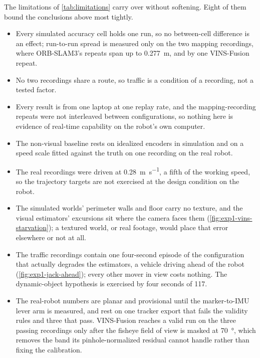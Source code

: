 The limitations of \cref{tab:limitations} carry over without softening. Eight
of them bound the conclusions above most tightly.

\begin{itemize}
\item Every simulated accuracy cell holds one run, so no between-cell
      difference is an effect; run-to-run spread is measured only on the two
      mapping recordings, where ORB-SLAM3's repeats span up to
      \SI{0.277}{\metre}, and by one VINS-Fusion repeat.
\item No two recordings share a route, so traffic is a condition of a
      recording, not a tested factor.
\item Every result is from one laptop at one replay rate, and the
      mapping-recording repeats were not interleaved between configurations,
      so nothing here is evidence of real-time capability on the robot's own
      computer.
\item The non-visual baseline rests on idealized encoders in simulation and on
      a speed scale fitted against the truth on one recording on the real
      robot.
\item The real recordings were driven at \SI{0.28}{\metre\per\second}, a
      fifth of the working speed, so the trajectory targets are not exercised
      at the design condition on the robot.
\item The simulated worlds' perimeter walls and floor carry no texture, and
      the visual estimators' excursions sit where the camera faces them
      (\cref{fig:exp1-vins-starvation}); a textured world, or real footage,
      would place that error elsewhere or not at all.
\item The traffic recordings contain one four-second episode of the
      configuration that actually degrades the estimators, a vehicle driving
      ahead of the robot (\cref{fig:exp1-jack-ahead}); every other mover in
      view costs nothing. The dynamic-object hypothesis is exercised by four
      seconds of 117.
\item The real-robot numbers are planar and provisional until the
      marker-to-IMU lever arm is measured, and rest on one tracker export that
      fails the validity rules and three that pass. VINS-Fusion reaches a
      valid run on the three passing recordings only after the fisheye field of
      view is masked at \SI{70}{\degree}, which removes the band its
      pinhole-normalized residual cannot handle rather than fixing the
      calibration.
\end{itemize}


